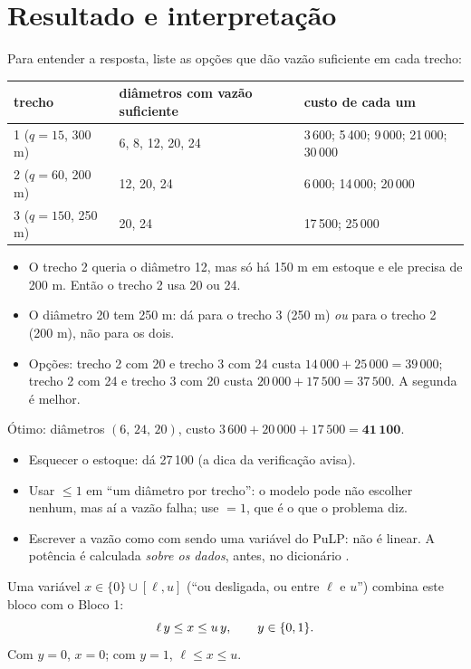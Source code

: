 \section{Resultado e interpretação}

Para entender a resposta, liste as opções que dão vazão suficiente em cada trecho:
\begin{center}
\begin{tabular}{lll}
\toprule
trecho & diâmetros com vazão suficiente & custo de cada um\\
\midrule
1 ($q=15$, 300 m) & 6, 8, 12, 20, 24 & 3\,600; 5\,400; 9\,000; 21\,000; 30\,000\\
2 ($q=60$, 200 m) & 12, 20, 24 & 6\,000; 14\,000; 20\,000\\
3 ($q=150$, 250 m) & 20, 24 & 17\,500; 25\,000\\
\bottomrule
\end{tabular}
\end{center}
\begin{itemize}
  \item O trecho 2 queria o diâmetro 12, mas só há 150 m em estoque e ele precisa de 200 m. Então o trecho 2 usa 20
  ou 24.
  \item O diâmetro 20 tem 250 m: dá para o trecho 3 (250 m) \emph{ou} para o trecho 2 (200 m), não para os dois.
  \item Opções: trecho 2 com 20 e trecho 3 com 24 custa $14\,000+25\,000=39\,000$; trecho 2 com 24 e trecho 3 com 20
  custa $20\,000+17\,500=37\,500$. A segunda é melhor.
\end{itemize}
Ótimo: diâmetros $(6,\,24,\,20)$, custo $3\,600+20\,000+17\,500=\mathbf{41\,100}$.

\begin{atencao}
\begin{itemize}
  \item Esquecer o estoque: dá 27\,100 (a dica da verificação avisa).
  \item Usar $\le 1$ em ``um diâmetro por trecho'': o modelo pode não escolher nenhum, mas aí a vazão falha;
  use $=1$, que é o que o problema diz.
  \item Escrever a vazão como  com  sendo uma variável do PuLP: não é linear. A potência é
  calculada \emph{sobre os dados}, antes, no dicionário .
\end{itemize}
\end{atencao}

\begin{resumo}
Uma variável $x\in\{0\}\cup[\ell,u]$ (``ou desligada, ou entre $\ell$ e $u$'') combina este bloco com o Bloco 1:
\[
\ell\,y\le x\le u\,y,\qquad y\in\{0,1\}.
\]
Com $y=0$, $x=0$; com $y=1$, $\ell\le x\le u$.
\end{resumo}
